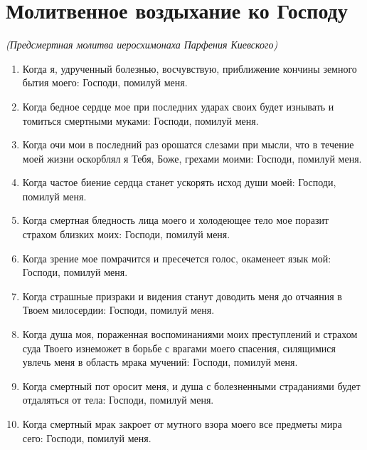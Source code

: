 \section{Молитвенное воздыхание ко Господу}\begin{mymulticols}
 

\itshape (Предсмертная молитва иеросхимонаха Парфения Киевского)\normalfont{}

\begin{enumerate}

\item Когда я, удрученный болезнью, восчувствую, приближение кончины земного бытия моего: Господи, помилуй меня. 

\item Когда бедное сердце мое при последних ударах своих будет изнывать и томиться смертными муками: Господи, помилуй меня. 

\item Когда очи мои в последний раз орошатся слезами при мысли, что в течение моей жизни оскорблял я Тебя, Боже, грехами моими: Господи, помилуй меня. 

\item Когда частое биение сердца станет ускорять исход души моей: Господи, помилуй меня. 

\item Когда смертная бледность лица моего и холодеющее тело мое поразит страхом близких моих: Господи, помилуй меня. 

\item Когда зрение мое помрачится и пресечется голос, окаменеет язык мой: Господи, помилуй меня. 

\item Когда страшные призраки и видения станут доводить меня до отчаяния в Твоем милосердии: Господи, помилуй меня. 

\item Когда душа моя, пораженная воспоминаниями моих преступлений и страхом суда Твоего изнеможет в борьбе с врагами моего спасения, силящимися увлечь меня в область мрака мучений: Господи, помилуй меня. 

\item Когда смертный пот оросит меня, и душа с болезненными страданиями будет отдаляться от тела: Господи, помилуй меня. 

\item Когда смертный мрак закроет от мутного взора моего все предметы мира сего: Господи, помилуй меня. 


\end{enumerate}
\end{mymulticols}
